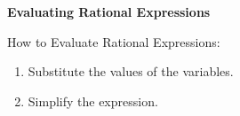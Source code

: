 \begin{center}
\textbf{Evaluating Rational Expressions 
}
\end{center}

\vspce

How to Evaluate Rational Expressions:
\begin{enumerate}
\item Substitute the values of the variables.
\item Simplify the expression. 
\end{enumerate}